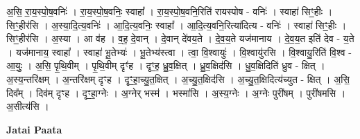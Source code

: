 \documentclass[17pt]{extarticle}
\begin{document}
अ॒सि॒ रा॒य॒स्पो॒ष॒वनिः॑ । रा॒य॒स्पो॒ष॒वनिः॒ स्वाहा᳚ । रा॒य॒स्पो॒ष॒वनि॒रिति॑ रायस्पोष - वनिः॑ । स्वाहा॑ सिꣳ॒॒हीः । सिꣳ॒॒हीर॑सि । अ॒स्या॒दि॒त्य॒वनिः॑ । आ॒दि॒त्य॒वनिः॒ स्वाहा᳚ । आ॒दि॒त्य॒वनि॒रित्या॑दित्य - वनिः॑ । स्वाहा॑ सिꣳ॒॒हीः । सिꣳ॒॒हीर॑सि । अ॒स्या । आ व॑ह । व॒ह॒ दे॒वान् । दे॒वान् दे॑वय॒ते । दे॒व॒य॒ते यज॑मानाय । दे॒व॒य॒त इति॑ देव - य॒ते । यज॑मानाय॒ स्वाहा᳚ । स्वाहा॑ भू॒तेभ्यः॑ । भू॒तेभ्य॑स्त्वा । त्वा॒ वि॒श्वायुः॑ । वि॒श्वायु॑रसि । वि॒श्वायु॒रिति॑ वि॒श्व - आ॒युः॒ । अ॒सि॒ पृ॒थि॒वीम् । पृ॒थि॒वीम् दृꣳ॑ह । दृꣳ॒॒ह॒ ध्रु॒व॒क्षित् । ध्रु॒व॒क्षिद॑सि । धु॒व॒क्षिदिति॑ ध्रुव - क्षित् । अ॒स्य॒न्तरि॑क्षम् । अ॒न्तरि॑क्षम् दृꣳह । दृꣳ॒॒हा॒च्यु॒त॒क्षित् । अ॒च्यु॒त॒क्षिद॑सि । अ॒च्यु॒त॒क्षिदित्य॑च्युत - क्षित् । अ॒सि॒ दिव᳚म् । दिव॑म् दृꣳह । दृꣳ॒॒हा॒ग्नेः । अ॒ग्नेर् भस्म॑ । भस्मा॑सि । अ॒स्य॒ग्नेः । अ॒ग्नेः पुरी॑षम् । पुरी॑षमसि । अ॒सीत्य॑सि । \newline

\textbf{Jatai Paata} \newline
\end{document}
